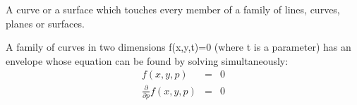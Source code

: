 A curve or a surface which touches every member of a family of lines, curves,
planes or surfaces.
\par
A family of curves in two dimensions f(x,y,t)=0 (where t is a 
parameter) has an envelope whose equation can be found by
solving simultaneously:
\begin{eqnarray*}
  f(x,y,p)&=&0 \\
  \frac{\partial}{\partial p } f(x,y,p) &=& 0
\end{eqnarray*}